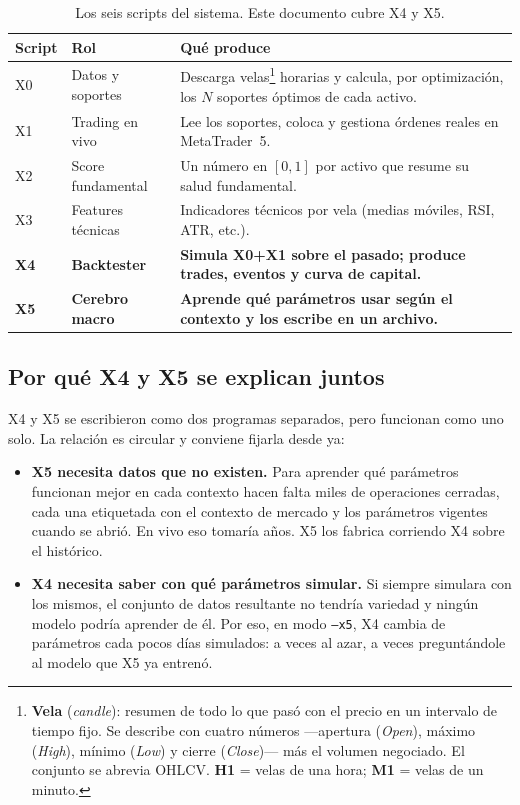 \documentclass[11pt,a4paper]{article}
\newcommand{\code}[1]{\texttt{\small #1}}
\begin{document}
\begin{table}[h]
\centering
\small
\begin{tabularx}{\linewidth}{@{}l l X@{}}
\toprule
\textbf{Script} & \textbf{Rol} & \textbf{Qué produce} \\
\midrule
X0 & Datos y soportes & Descarga velas\footnote{\textbf{Vela} (\textit{candle}): resumen
de todo lo que pasó con el precio en un intervalo de tiempo fijo. Se describe con cuatro
números —apertura (\textit{Open}), máximo (\textit{High}), mínimo (\textit{Low}) y cierre
(\textit{Close})— más el volumen negociado. El conjunto se abrevia OHLCV. \textbf{H1} =
velas de una hora; \textbf{M1} = velas de un minuto.} horarias y calcula, por optimización,
los $N$ soportes óptimos de cada activo. \\
X1 & Trading en vivo & Lee los soportes, coloca y gestiona órdenes reales en MetaTrader~5. \\
X2 & Score fundamental & Un número en $[0,1]$ por activo que resume su salud fundamental. \\
X3 & Features técnicas & Indicadores técnicos por vela (medias móviles, RSI, ATR, etc.). \\
\textbf{X4} & \textbf{Backtester} & \textbf{Simula X0+X1 sobre el pasado; produce trades, eventos y curva de capital.} \\
\textbf{X5} & \textbf{Cerebro macro} & \textbf{Aprende qué parámetros usar según el contexto y los escribe en un archivo.} \\
\bottomrule
\end{tabularx}
\caption{Los seis scripts del sistema. Este documento cubre X4 y X5.}
\label{tab:pipeline}
\end{table}

\subsection{Por qué X4 y X5 se explican juntos}

X4 y X5 se escribieron como dos programas separados, pero funcionan como uno solo. La
relación es circular y conviene fijarla desde ya:

\begin{itemize}[leftmargin=1.4em,itemsep=2pt]
\item \textbf{X5 necesita datos que no existen.} Para aprender qué parámetros funcionan
mejor en cada contexto hacen falta miles de operaciones cerradas, cada una etiquetada con
el contexto de mercado y los parámetros vigentes cuando se abrió. En vivo eso tomaría
años. X5 los fabrica corriendo X4 sobre el histórico.
\item \textbf{X4 necesita saber con qué parámetros simular.} Si siempre simulara con los
mismos, el conjunto de datos resultante no tendría variedad y ningún modelo podría
aprender de él. Por eso, en modo \code{--x5}, X4 cambia de parámetros cada pocos días
simulados: a veces al azar, a veces preguntándole al modelo que X5 ya entrenó.
\end{itemize}
\end{document}
